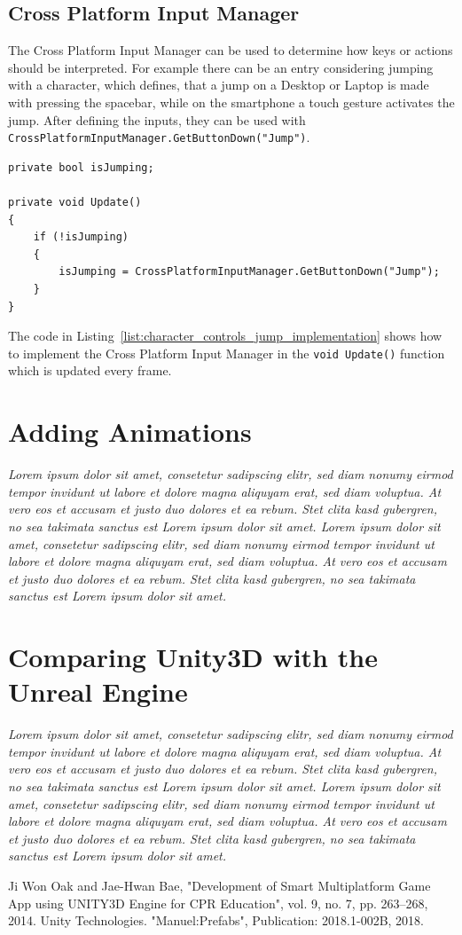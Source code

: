 \documentclass[conference]{IEEEtran}
\begin{document}
\subsection{Cross Platform Input Manager}

The Cross Platform Input Manager can be used to determine how keys or actions should be interpreted. For example there can be an entry considering jumping with a character, which defines, that a jump on a Desktop or Laptop is made with pressing the spacebar, while on the smartphone a touch gesture activates the jump. After defining the inputs, they can be used with \lstinline!CrossPlatformInputManager.GetButtonDown("Jump")!. \\

\begin{lstlisting}[caption=Example Implementation for Determining a Jump,label=list:character_controls_jump_implementation]
private bool isJumping;

private void Update()
{
	if (!isJumping)
	{
		isJumping = CrossPlatformInputManager.GetButtonDown("Jump");
	}
}
\end{lstlisting}

The code in Listing~\ref{list:character_controls_jump_implementation} shows how to implement the Cross Platform Input Manager in the \lstinline!void Update()! function which is updated every frame. 

\section{Adding Animations}

\emph{Lorem ipsum dolor sit amet, consetetur sadipscing elitr, sed diam nonumy eirmod tempor invidunt ut labore et dolore magna aliquyam erat, sed diam voluptua. At vero eos et accusam et justo duo dolores et ea rebum. Stet clita kasd gubergren, no sea takimata sanctus est Lorem ipsum dolor sit amet. Lorem ipsum dolor sit amet, consetetur sadipscing elitr, sed diam nonumy eirmod tempor invidunt ut labore et dolore magna aliquyam erat, sed diam voluptua. At vero eos et accusam et justo duo dolores et ea rebum. Stet clita kasd gubergren, no sea takimata sanctus est Lorem ipsum dolor sit amet.}

\section{Comparing Unity3D with the Unreal Engine}

\emph{Lorem ipsum dolor sit amet, consetetur sadipscing elitr, sed diam nonumy eirmod tempor invidunt ut labore et dolore magna aliquyam erat, sed diam voluptua. At vero eos et accusam et justo duo dolores et ea rebum. Stet clita kasd gubergren, no sea takimata sanctus est Lorem ipsum dolor sit amet. Lorem ipsum dolor sit amet, consetetur sadipscing elitr, sed diam nonumy eirmod tempor invidunt ut labore et dolore magna aliquyam erat, sed diam voluptua. At vero eos et accusam et justo duo dolores et ea rebum. Stet clita kasd gubergren, no sea takimata sanctus est Lorem ipsum dolor sit amet.}


\begin{thebibliography}{00}
 Ji Won Oak and Jae-Hwan Bae, "Development of Smart Multiplatform Game App using UNITY3D Engine for CPR Education", vol. 9, no. 7, pp. 263--268, 2014.
 Unity Technologies. "Manuel:Prefabs", Publication: 2018.1-002B, 2018.
\end{thebibliography}
\end{document}
